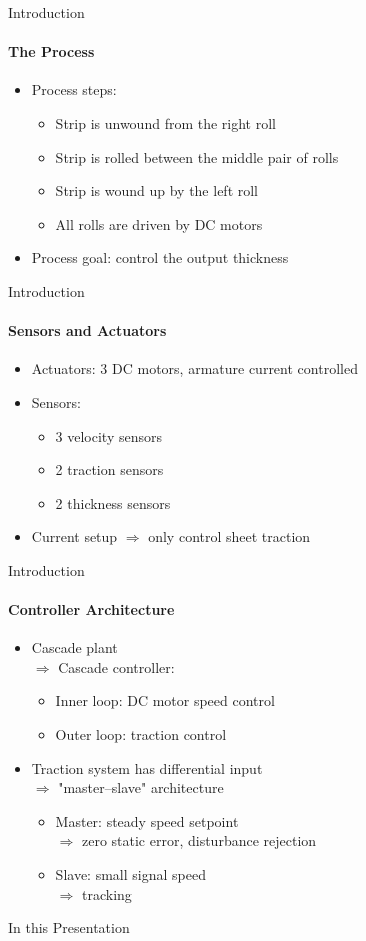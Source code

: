 \begin{frame}{Introduction}
  \framesubtitle{The Process}
  \begin{itemize}
    \item Process steps:
    \begin{itemize}
      \item Strip is unwound from the right roll
      \item Strip is rolled between the middle pair of rolls
      \item Strip is wound up by the left roll
      \item All rolls are driven by DC motors
    \end{itemize}
    \item Process goal: control the output thickness
  \end{itemize}
\end{frame}

\begin{frame}{Introduction}
  \framesubtitle{Sensors and Actuators}
  \begin{itemize}
    \item Actuators: 3 DC motors, armature current controlled
    \item Sensors:
    \begin{itemize}
      \item 3 velocity sensors
      \item 2 traction sensors
      \item 2 thickness sensors
    \end{itemize}
    \item Current setup $\Rightarrow$ only control sheet traction
  \end{itemize}
\end{frame}

\begin{frame}{Introduction}
  \framesubtitle{Controller Architecture}
  \begin{itemize}
    \item Cascade plant \\$\Rightarrow$ Cascade controller:
    \begin{itemize}
      \item Inner loop: DC motor speed control
      \item Outer loop: traction control
    \end{itemize}
    \item Traction system has differential input \\$\Rightarrow$ "master--slave" architecture
    \begin{itemize}
    \item Master: steady speed setpoint \\$\Rightarrow$ zero static error, disturbance rejection
    \item Slave: small signal speed \\$\Rightarrow$ tracking
    \end{itemize}
  \end{itemize}
\end{frame}

\begin{frame}{In this Presentation}
\tableofcontents
\end{frame}
